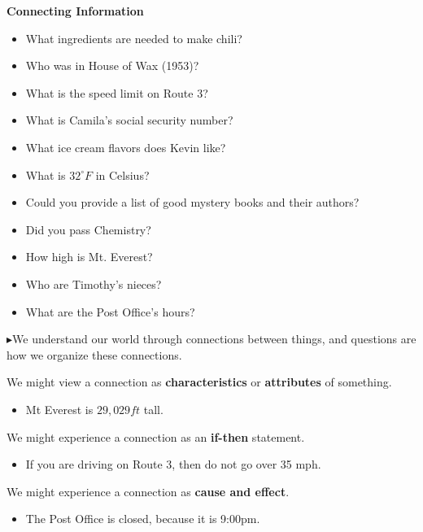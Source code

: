 \documentclass{ximera}
\begin{document}
\begin{observation} \textbf{\textcolor{-red!75}{Connecting Information}}  

\begin{itemize} 
\item What ingredients are needed to make chili?
\item Who was in House of Wax (1953)?
\item What is the speed limit on Route 3?
\item What is Camila's social security number?
\item What ice cream flavors does Kevin like?
\item What is $32^\circ F$ in Celsius?
\item Could you provide a list of good mystery books and their authors?
\item Did you pass Chemistry?
\item How high is Mt. Everest?
\item Who are Timothy's nieces?
\item What are the Post Office's hours?
\end{itemize}

$\blacktriangleright$We understand our world through connections between things, and questions are how we organize these connections. 


We might view a connection as \textbf{\textcolor{purple!85!blue}{characteristics}} or \textbf{\textcolor{purple!85!blue}{attributes}} of something. 
\begin{itemize}
\item Mt Everest is $29,029 ft$ tall.
\end{itemize}


We might experience a connection as an \textbf{\textcolor{purple!85!blue}{if-then}} statement.
\begin{itemize}
\item If you are driving on Route 3, then do not go over 35 mph.
\end{itemize}



We might experience a connection as \textbf{\textcolor{purple!85!blue}{cause and effect}}.
\begin{itemize}
\item The Post Office is closed, because it is 9:00pm.
\end{itemize}

\end{observation}
\end{document}
